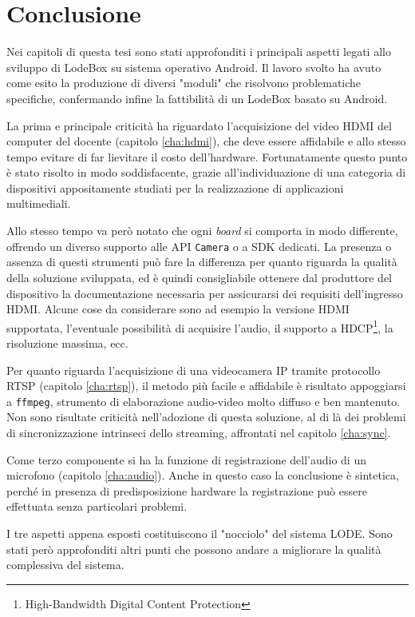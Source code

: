 \chapter{Conclusione}
\label{cha:conclusione}

Nei capitoli di questa tesi sono stati approfonditi i principali aspetti legati allo sviluppo di LodeBox su sistema operativo Android. Il lavoro svolto ha avuto come esito la produzione di diversi "moduli" che risolvono problematiche specifiche, confermando infine la fattibilità di un LodeBox basato su Android.

La prima e principale criticità ha riguardato l'acquisizione del video HDMI del computer del docente (capitolo \ref{cha:hdmi}), che deve essere affidabile e allo stesso tempo evitare di far lievitare il costo dell'hardware. Fortunatamente questo punto è stato risolto in modo soddisfacente, grazie all'individuazione di una categoria di dispositivi appositamente studiati per la realizzazione di applicazioni multimediali.

Allo stesso tempo va però notato che ogni \emph{board} si comporta in modo differente, offrendo un diverso supporto alle API \texttt{Camera} o a SDK dedicati. La presenza o assenza di questi strumenti può fare la differenza per quanto riguarda la qualità della soluzione sviluppata, ed è quindi consigliabile ottenere dal produttore del dispositivo la documentazione necessaria per assicurarsi dei requisiti dell'ingresso HDMI. Alcune cose da considerare sono ad esempio la versione HDMI supportata, l'eventuale possibilità di acquisire l'audio, il supporto a HDCP\footnote{High-Bandwidth Digital Content Protection}, la risoluzione massima, ecc.

Per quanto riguarda l'acquisizione di una videocamera IP tramite protocollo RTSP (capitolo \ref{cha:rtsp}), il metodo più facile e affidabile è risultato appoggiarsi a \texttt{ffmpeg}, strumento di elaborazione audio-video molto diffuso e ben mantenuto. Non sono risultate criticità nell'adozione di questa soluzione, al di là dei problemi di sincronizzazione intrinseci dello streaming, affrontati nel capitolo \ref{cha:sync}.

Come terzo componente si ha la funzione di registrazione dell'audio di un microfono (capitolo \ref{cha:audio}). Anche in questo caso la conclusione è sintetica, perché in presenza di predisposizione hardware la registrazione può essere effettuata senza particolari problemi.

I tre aspetti appena esposti costituiscono il "nocciolo" del sistema LODE. Sono stati però approfonditi altri punti che possono andare a migliorare la qualità complessiva del sistema.

